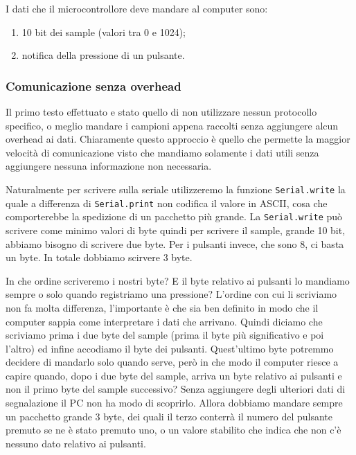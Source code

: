 \documentclass[a4paper,11pt]{article}
\begin{document}
I dati che il microcontrollore deve mandare al computer sono:
\begin{enumerate}
    \item 10 bit dei sample (valori tra 0 e 1024);
    \item notifica della pressione di un pulsante.
\end{enumerate}

\subsubsection{Comunicazione senza overhead}
Il primo testo effettuato e stato quello di non utilizzare nessun protocollo specifico, o meglio mandare i campioni appena raccolti senza aggiungere alcun overhead ai dati. Chiaramente questo approccio è quello che permette la maggior velocità di comunicazione visto che mandiamo solamente i dati utili senza aggiungere nessuna informazione non necessaria.

Naturalmente per scrivere sulla seriale utilizzeremo la funzione \texttt{Serial.write} la quale a differenza di \texttt{Serial.print} non codifica il valore in ASCII, cosa che comporterebbe la spedizione di un pacchetto più grande. La \texttt{Serial.write} può scrivere come minimo valori di byte quindi per scrivere il sample, grande 10 bit, abbiamo bisogno di scrivere due byte. Per i pulsanti invece, che sono 8, ci basta un byte. In totale dobbiamo scirvere 3 byte.

In che ordine scriveremo i nostri byte? E il byte relativo ai pulsanti lo mandiamo sempre o solo quando registriamo una pressione? L'ordine con cui li scriviamo non fa molta differenza, l'importante è che sia ben definito in modo che il computer sappia come interpretare i dati che arrivano. Quindi diciamo che scriviamo prima i due byte del sample (prima il byte più significativo e poi l'altro) ed infine accodiamo il byte dei pulsanti. 
Quest'ultimo byte potremmo decidere di mandarlo solo quando serve, però in che modo il computer riesce a capire quando, dopo i due byte del sample, arriva un byte relativo ai pulsanti e non il primo byte del sample successivo? Senza aggiungere degli ulteriori dati di segnalazione il PC non ha modo di scoprirlo. Allora dobbiamo mandare sempre un pacchetto grande 3 byte, dei quali il terzo conterrà il numero del pulsante premuto se ne è stato premuto uno, o un valore stabilito che indica che non c'è nessuno dato relativo ai pulsanti.
\vspace{0.2in}
\end{document}
